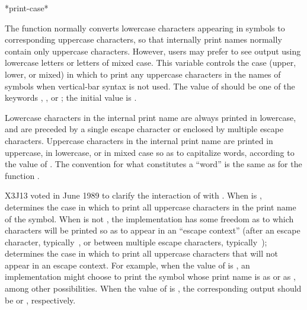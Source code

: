 \begin{defun}[Variable]
*print-case*

The  function normally converts lowercase characters
appearing in symbols to corresponding uppercase characters,
so that internally print
names normally contain only uppercase characters.
However, users may prefer to see output using lowercase letters
or letters of mixed case.
This variable controls the case (upper, lower, or mixed) in which to print
any uppercase characters in the names of symbols
when vertical-bar syntax is not used.
The value of  should be one of the keywords
, , or ;
the initial value is .

Lowercase characters in the internal print name
are always printed in lowercase, and are
preceded by a single escape character or enclosed by multiple
escape characters.
Uppercase characters in the internal print name
are printed in uppercase, in lowercase, or in mixed case
so as to capitalize words, according to the value of
.  The convention for what constitutes
a ``word'' is the same as for the function .

\begin{newer}
X3J13 voted in June 1989 
to clarify the interaction of  with .
When  is ,  determines the
case in which to print all uppercase characters in the print name of the symbol.
When  is not , the implementation has some freedom
as to which characters will be printed so as to appear in an ``escape context''
(after an escape character, typically~\cd{\Xbackslash}, or between multiple escape characters,
typically~\cd{|});  determines the
case in which to print all uppercase characters that will not appear in an escape context.
For example, when the value of  is ,
an implementation might choose to print the symbol whose print name is 
as  or as , among other possibilities.
When the value of  is , the corresponding output
should be  or , respectively.


\end{newer}
\end{defun}
